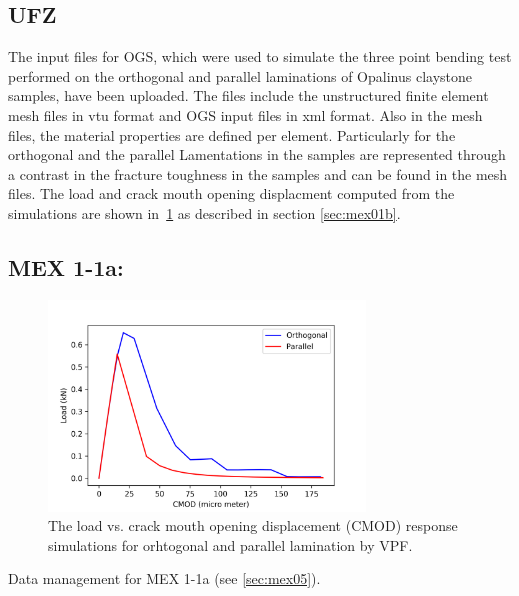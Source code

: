 \subsection*{UFZ}
The input files for OGS, which were used to simulate the three point bending test performed on the orthogonal and parallel laminations of Opalinus claystone samples, have been uploaded.
The files include the unstructured finite element mesh files in vtu format and OGS input files in xml format.
Also in the mesh files, the material properties are defined per element. 
Particularly for the orthogonal and the parallel Lamentations in the samples are represented through a contrast in the fracture toughness in the samples and can be found in the mesh files.
The load and crack mouth opening displacment computed from the simulations are shown in~\ref{fig:Keita_ME1_VPF_Claystone} as described in section \ref {sec:mex01b}.
\subsection{MEX 1-1a:}


\begin{figure}[!ht]
\centering
\includegraphics[width=0.75\textwidth]{figures/VPF_ME1_ex_NF_CMOD.png}
\caption{The load vs. crack mouth opening displacement (CMOD) response simulations for orhtogonal and parallel lamination by VPF.}
\label{fig:Keita_ME1_VPF_Claystone}
\end{figure}

Data management for MEX 1-1a (see \ref{sec:mex05}).

